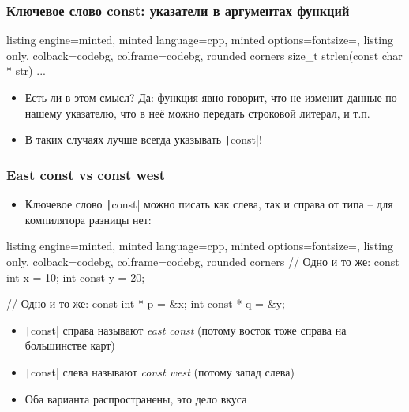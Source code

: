 \documentclass[10pt]{beamer}
\begin{document}
\begin{frame}[fragile]
\frametitle{Ключевое слово const: указатели в аргументах функций}
\begin{tcblisting}{listing engine=minted, minted language=cpp, minted options={fontsize=\scriptsize}, listing only, colback=codebg, colframe=codebg, rounded corners}
size_t strlen(const char * str) {
  ...
}
\end{tcblisting}
\begin{itemize}
\item Есть ли в этом смысл? \pause Да: функция явно говорит, что не изменит данные по нашему указателю, что в неё можно передать строковой литерал, и т.п.
\pause
\item В таких случаях лучше всегда указывать \texttt|const|!
\end{itemize}
\end{frame}

\begin{frame}[fragile]
\frametitle{East const vs const west}
\begin{itemize}
\item Ключевое слово \texttt|const| можно писать как слева, так и справа от типа -- для компилятора разницы нет:
\end{itemize}
\begin{tcblisting}{listing engine=minted, minted language=cpp, minted options={fontsize=\scriptsize}, listing only, colback=codebg, colframe=codebg, rounded corners}
// Одно и то же:
const int x = 10;
int const y = 20;

// Одно и то же:
const int * p = &x;
int const * q = &y;
\end{tcblisting}
\pause
{}
\begin{itemize}
\item \texttt|const| справа называют \textit{east const} (потому восток тоже справа на большинстве карт)
\item \texttt|const| слева называют \textit{const west} (потому запад слева)
\item Оба варианта распространены, это дело вкуса
\end{itemize}
\end{frame}
\end{document}
